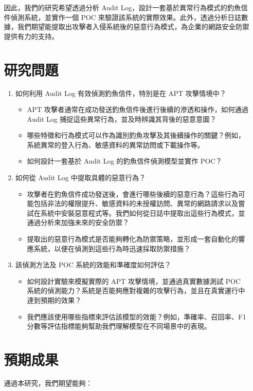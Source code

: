 \documentclass[a4paper,12pt]{article}
\begin{document}
因此，我們的研究希望透過分析 Audit Log，設計一套基於異常行為模式的釣魚信件偵測系統，並實作一個 POC 來驗證該系統的實際效果。此外，透過分析日誌數據，我們期望能提取出攻擊者入侵系統後的惡意行為模式，為企業的網路安全防禦提供有力的支持。

\section{研究問題}
\begin{enumerate}
    \item 如何利用 Audit Log 有效偵測釣魚信件，特別是在 APT 攻擊情境中？
    \begin{itemize}
        \item APT 攻擊者通常在成功發送釣魚信件後進行後續的滲透和操作，如何通過 Audit Log 捕捉這些異常行為，並及時辨識其背後的惡意意圖？
        \item 哪些特徵和行為模式可以作為識別釣魚攻擊及其後續操作的關鍵？例如，系統異常的登入行為、敏感資料的異常訪問或下載操作等。
        \item 如何設計一套基於 Audit Log 的釣魚信件偵測模型並實作 POC？
    \end{itemize}
    \item 如何從 Audit Log 中提取具體的惡意行為？
    \begin{itemize}
        \item 攻擊者在釣魚信件成功發送後，會進行哪些後續的惡意行為？這些行為可能包括非法的權限提升、敏感資料的未授權訪問、異常的網路請求以及嘗試在系統中安裝惡意程式等。我們如何從日誌中提取出這些行為模式，並通過分析來加強未來的安全防禦？
        \item 提取出的惡意行為模式是否能夠轉化為防禦策略，並形成一套自動化的響應系統，以便在偵測到這些行為時迅速採取防禦措施？
    \end{itemize}
    \item 該偵測方法及 POC 系統的效能和準確度如何評估？
    \begin{itemize}
        \item 如何設計實驗來模擬實際的 APT 攻擊情境，並通過真實數據測試 POC 系統的偵測能力？系統是否能夠應對複雜的攻擊行為，並且在真實運行中達到預期的效果？
        \item 我們應該使用哪些指標來評估該模型的效能？例如，準確率、召回率、F1 分數等評估指標能夠幫助我們理解模型在不同場景中的表現。
    \end{itemize}
\end{enumerate}

\section{預期成果}
通過本研究，我們期望能夠：
\end{document}
